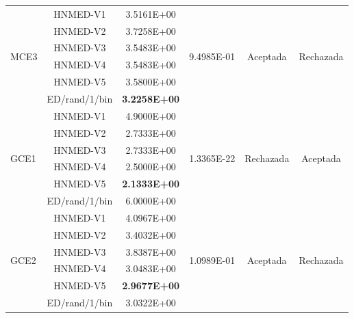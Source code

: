 \begin{table}
{\begin{tabular}{lccccc}
			\multirow{6}{*}{MCE3} & HNMED-V1      &  3.5161E+00        & \multirow{6}{*}{9.4985E-01}  & \multirow{6}{*}{Aceptada}& \multirow{6}{*}{Rechazada} \\
			& HNMED-V2      & 3.7258E+00         &                    &                          &                            \\
			& HNMED-V3      & 3.5483E+00         &                    &                          &                            \\
			& HNMED-V4      & 3.5483E+00         &                    &                          &                            \\
			& HNMED-V5      &  3.5800E+00         &                    &                          &                            \\
			& ED/rand/1/bin & \textbf{3.2258E+00}    &                    &                          &                            \\
			\hline  
			\multirow{6}{*}{GCE1} & HNMED-V1      &   4.9000E+00       & \multirow{6}{*}{1.3365E-22}  & \multirow{6}{*}{Rechazada}& \multirow{6}{*}{Aceptada} \\
			& HNMED-V2      &   2.7333E+00       &                    &                          &                            \\
			& HNMED-V3      &   2.7333E+00       &                    &                          &                            \\
			& HNMED-V4      &   2.5000E+00       &                    &                          &                            \\
			& HNMED-V5      &\textbf{2.1333E+00} &                    &                          &                            \\
			& ED/rand/1/bin &   6.0000E+00       &                    &                          &                            \\
			\hline  
			\multirow{6}{*}{GCE2} & HNMED-V1      &  4.0967E+00        & \multirow{6}{*}{1.0989E-01}  & \multirow{6}{*}{Aceptada}& \multirow{6}{*}{Rechazada} \\
			& HNMED-V2      &  3.4032E+00        &                    &                          &                            \\
			& HNMED-V3      &  3.8387E+00        &                    &                          &                            \\
			& HNMED-V4      &  3.0483E+00        &                    &                          &                            \\
			& HNMED-V5      & \textbf{2.9677E+00}      &                    &                          &                            \\
			& ED/rand/1/bin & 3.0322E+00&                    &                          &                            \\
			\hline  
			

\end{tabular}}
\end{table}
